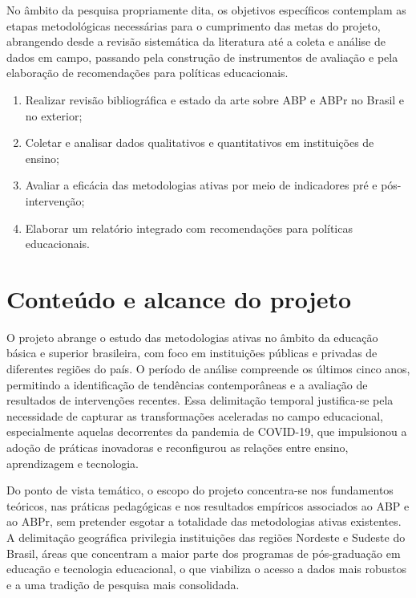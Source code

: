 No âmbito da pesquisa propriamente dita, os objetivos específicos contemplam as etapas metodológicas necessárias para o cumprimento das metas do projeto, abrangendo desde a revisão sistemática da literatura até a coleta e análise de dados em campo, passando pela construção de instrumentos de avaliação e pela elaboração de recomendações para políticas educacionais.

\begin{enumerate}
    \item Realizar revisão bibliográfica e estado da arte sobre ABP e ABPr no Brasil e no exterior;
    \item Coletar e analisar dados qualitativos e quantitativos em instituições de ensino;
    \item Avaliar a eficácia das metodologias ativas por meio de indicadores pré e pós-intervenção;
    \item Elaborar um relatório integrado com recomendações para políticas educacionais.
\end{enumerate}


\section{Conteúdo e alcance do projeto}
\label{sec:conteudo_alcance}

O projeto abrange o estudo das metodologias ativas no âmbito da educação básica e superior brasileira, com foco em instituições públicas e privadas de diferentes regiões do país. O período de análise compreende os últimos cinco anos, permitindo a identificação de tendências contemporâneas e a avaliação de resultados de intervenções recentes. Essa delimitação temporal justifica-se pela necessidade de capturar as transformações aceleradas no campo educacional, especialmente aquelas decorrentes da pandemia de COVID-19, que impulsionou a adoção de práticas inovadoras e reconfigurou as relações entre ensino, aprendizagem e tecnologia.

Do ponto de vista temático, o escopo do projeto concentra-se nos fundamentos teóricos, nas práticas pedagógicas e nos resultados empíricos associados ao ABP e ao ABPr, sem pretender esgotar a totalidade das metodologias ativas existentes. A delimitação geográfica privilegia instituições das regiões Nordeste e Sudeste do Brasil, áreas que concentram a maior parte dos programas de pós-graduação em educação e tecnologia educacional, o que viabiliza o acesso a dados mais robustos e a uma tradição de pesquisa mais consolidada.

